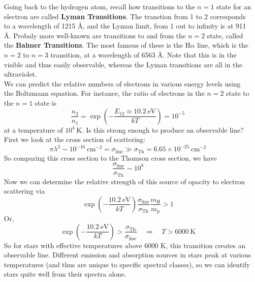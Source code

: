 \documentclass[10pt]{article}
\numberwithin{equation}{section}
\newcommand{\n}{\noindent}
\begin{document}
    \n Going back to the hydrogen atom, recall how transitions to the
    $n=1$ state for an electron are called \textbf{Lyman
      Transitions}. The transtion from 1 to 2 corresponds to a
    wavelength of 1215 \AA, and the Lyman limit, from 1 out to infinity
    is at 911 \AA. Probaly more well-known are transitions to and from the
    $n=2$ state, called the \textbf{Balmer Transitions}. The most famous of
    these is the H$\alpha$ line, which is the $n=2$ to $n=3$
    transition, at a wavelength of 6563 \AA. Note that this is in the
    visible and thus easily observable, whereas the Lyman transitions
    are all in the ultraviolet.\\

    \n We can predict the relative numbers of electrons in various
    energy levels using the Boltzmann equation. For instance, the
    ratio of electrons in the $n=2$ state to the $n=1$ state is 
    \begin{equation}
      \label{eq:217}
      \frac{n_2}{n_1}=\exp\left(-\frac{E_{12}\approx 10.2\ \mathrm{eV}}{kT}
\right)=10^{-5}
    \end{equation}
    at a temperature of $10^4\ \mathrm{K}$. Is this strong enough to
    produce an observable line? First we look at the cross section of
    scattering:
    \begin{equation}
      \label{eq:218}
      \pi\lambda^2\sim 10^{-16}\ \mathrm{cm^{-2}}=\sigma_{\mathrm{line}}\gg 
\sigma_{\mathrm{Th}}=6.65\times
      10^{-25}\ \mathrm{cm^{-2}}
    \end{equation}
    So comparing this cross section to the Thomson cross section, we
    have
    \begin{equation}
      \label{eq:219}
      \frac{\sigma_{\mathrm{line}}}{\sigma_{\mathrm{Th}}}\sim 10^8
    \end{equation}
    Now we can determine the relative strength of this source of
    opacity to electron scattering via
    \begin{equation}
      \label{eq:220}
      \exp\left(-\frac{10.2\
          \mathrm{eV}}{kT}\right)\frac{\sigma_{\mathrm{line}}}{\sigma_
{\mathrm{Th}}}\frac{m_\mathrm{H}}{m_{\mathrm{p}}}>1
    \end{equation}
    Or,
    \begin{equation}
      \label{eq:221}
      \exp\left(-\frac{10.2\
          \mathrm{eV}}{kT}\right)>\frac{\sigma_{\mathrm{Th}}}{\sigma_
{\mathrm{line}}}\quad\Rightarrow\quad
      T>6000\ \mathrm{K}
    \end{equation}
    So for stars with effective temperatures above 6000 K, this
    transition creates an observable line. Different emission and
    absorption sources in stars peak at various temperatures (and thus
    are unique to specific spectral classes), so we can identify stars
    quite well from their spectra alone.
\end{document}

